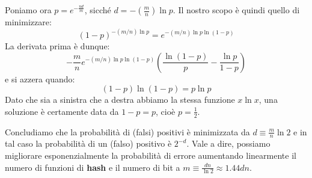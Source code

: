 \documentclass[\main/main.tex]{subfiles}
\begin{document}
\begin{multicols}{2}
\begin{analysis}
    Poniamo ora \(p=e^{-\frac{n d}{m}}\), sicché \(d=-(\frac{m}{n}) \ln p\). Il nostro scopo è quindi quello di minimizzare:
    \[
        (1-p)^{-(m / n) \ln p}=e^{-(m / n) \ln p \ln (1-p)}
    \]
    La derivata prima è dunque:
    \[
        -\frac{m}{n} e^{-(m / n) \ln p \ln (1-p)}\left(\frac{\ln (1-p)}{p}-\frac{\ln p}{1-p}\right)
    \]
    e si azzera quando:
    \[
        (1-p) \ln (1-p)=p \ln p
    \]
    Dato che sia a sinistra che a destra abbiamo la stessa funzione \(x \ln x\), una soluzione è certamente data da \(1-p = p\), cioè \(p = \frac{1}{2}\).  

Concludiamo che la probabilità di (falsi) positivi è minimizzata da \(d \equiv \frac{m}{n} \ln 2\) e in tal caso la probabilità di un (falso) positivo è \(2^{-d}\). Vale a dire, possiamo migliorare esponenzialmente la probabilità di errore aumentando linearmente il numero di funzioni di \textbf{hash} e il numero di bit a \(m \equiv \frac{dn}{\ln 2} \approx 1.44 dn\).
\end{analysis}
\end{multicols}
\end{document}
